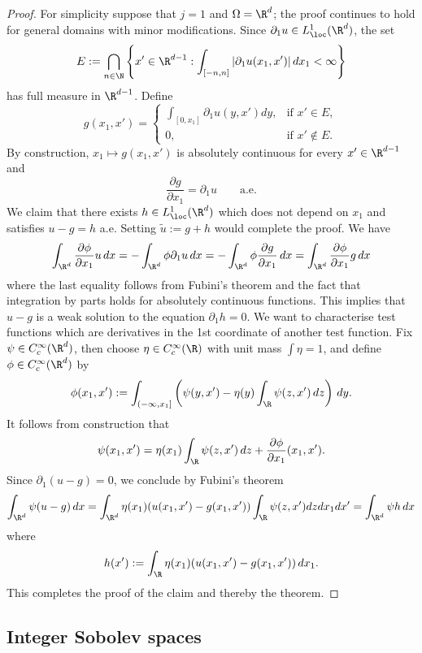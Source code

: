 \documentclass[reqno]{amsart}
\theoremstyle{definition}
\theoremstyle{remark}
\begin{document}
\begin{proof}
	For simplicity suppose that $j = 1$ and $\Omega = \R^d$; the proof continues to hold for general domains with minor modifications. Since $\partial_1 u \in L^1_\loc (\R^d)$, the set
		\[ E := \bigcap_{n \in \N} \left\{ x' \in \R^{d - 1} : \int_{[-n, n]} |\partial_1 u (x_1, x')| \, dx_1 < \infty \right\} \]
	has full measure in $\R^{d - 1}$. Define
		\[
			g (x_1, x')
				=
				\begin{cases}
					\int_{[0, x_1]} \partial_1 u(y, x') dy, 		
								&\text{if } x' \in E, \\
					0, 			&\text{if } x' \not\in E.
				\end{cases}
		\]	
	By construction, $x_1 \mapsto g (x_1, x')$ is absolutely continuous for every $x' \in \R^{d - 1}$ and 
		\[ \frac{\partial g}{\partial x_1} = \partial_1 u \qquad \text{a.e.} \]
	We claim that there exists $h \in L^1_\loc (\R^d)$ which does not depend on $x_1$ and satisfies $u - g = h$ a.e. Setting $\tilde u := g + h$ would complete the proof. We have
		\[ \int_{\R^d} \frac{\partial \phi}{\partial x_1} u \, dx = - \int_{\R^d} \phi \partial_1 u \, dx = - \int_{\R^d} \phi \frac{\partial g}{\partial x_1} \, dx = \int_{\R^d}\frac{\partial \phi}{\partial x_1} g \, dx  \]	
	where the last equality follows from Fubini's theorem and the fact that integration by parts holds for absolutely continuous functions. This implies that $u - g$ is a weak solution to the equation $\partial_1 h = 0$. We want to characterise test functions which are derivatives in the 1st coordinate of another test function. Fix $\psi \in C^\infty_c (\R^d)$, then choose $\eta \in C^\infty_c (\R)$ with unit mass $\int \eta = 1$, and define $\phi \in C^\infty_c (\R^d)$ by 
		\[ \phi (x_1, x') := \int_{(-\infty, x_1]} \left( \psi(y, x') - \eta(y) \int_\R \psi(z, x') \, dz \right) \, dy. \]
	It follows from construction that 
		\[ \psi(x_1, x') = \eta(x_1) \int_\R \psi(z, x') \, dz + \frac{\partial \phi}{\partial x_1} (x_1, x'). \]	
	Since $\partial_1 (u - g) = 0$, we conclude by Fubini's theorem
		\[ \int_{\R^d} \psi (u - g) \, dx = \int_{\R^d} \eta(x_1)(u(x_1, x') - g(x_1, x')) \int_\R \psi(z, x') dz dx_1 dx' = \int_{\R^d} \psi h \, dx\]	
	where
		\[ h (x') := \int_\R \eta (x_1)(u(x_1, x') - g(x_1, x')) \, dx_1.  \]	
	This completes the proof of the claim and thereby the theorem. 
\end{proof}
\fi


\subsection{Integer Sobolev spaces}
\end{document}
